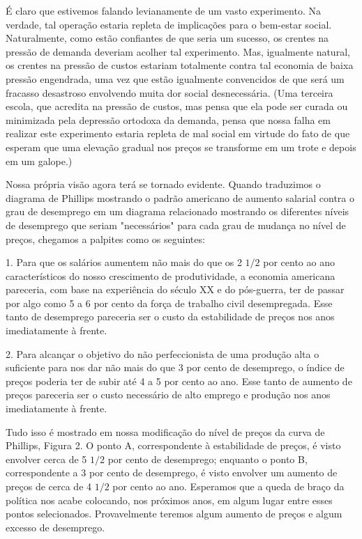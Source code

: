 \documentclass[12pt]{article}
\begin{document}
É claro que estivemos falando levianamente de um vasto experimento. Na verdade, tal operação estaria repleta de implicações para o bem-estar social. Naturalmente, como estão confiantes de que seria um sucesso, os crentes na pressão de demanda deveriam acolher tal experimento. Mas, igualmente natural, os crentes na pressão de custos estariam totalmente contra tal economia de baixa pressão engendrada, uma vez que estão igualmente convencidos de que será um fracasso desastroso envolvendo muita dor social desnecessária. (Uma terceira escola, que acredita na pressão de custos, mas pensa que ela pode ser curada ou minimizada pela depressão ortodoxa da demanda, pensa que nossa falha em realizar este experimento estaria repleta de mal social em virtude do fato de que esperam que uma elevação gradual nos preços se transforme em um trote e depois em um galope.)

Nossa própria visão agora terá se tornado evidente. Quando traduzimos o diagrama de Phillips mostrando o padrão americano de aumento salarial contra o grau de desemprego em um diagrama relacionado mostrando os diferentes níveis de desemprego que seriam "necessários" para cada grau de mudança no nível de preços, chegamos a palpites como os seguintes:

1. Para que os salários aumentem não mais do que os 2 $1/2$ por cento ao ano característicos do nosso crescimento de produtividade, a economia americana pareceria, com base na experiência do século XX e do pós-guerra, ter de passar por algo como 5 a 6 por cento da força de trabalho civil desempregada. Esse tanto de desemprego pareceria ser o custo da estabilidade de preços nos anos imediatamente à frente.

2. Para alcançar o objetivo do não perfeccionista de uma produção alta o suficiente para nos dar não mais do que 3 por cento de desemprego, o índice de preços poderia ter de subir até 4 a 5 por cento ao ano. Esse tanto de aumento de preços pareceria ser o custo necessário de alto emprego e produção nos anos imediatamente à frente.

Tudo isso é mostrado em nossa modificação do nível de preços da curva de Phillips, Figura 2. O ponto A, correspondente à estabilidade de preços, é visto envolver cerca de 5 $1/2$ por cento de desemprego; enquanto o ponto B, correspondente a 3 por cento de desemprego, é visto envolver um aumento de preços de cerca de 4 $1/2$ por cento ao ano. Esperamos que a queda de braço da política nos acabe colocando, nos próximos anos, em algum lugar entre esses pontos selecionados. Provavelmente teremos algum aumento de preços e algum excesso de desemprego.
\end{document}
